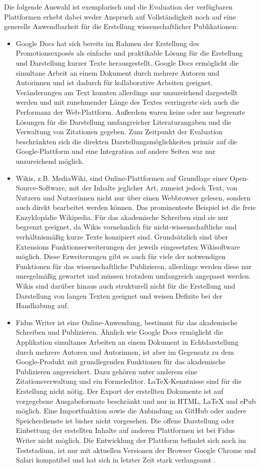 Die folgende Auswahl ist exemplarisch und die Evaluation der verfügbaren Plattformen erhebt dabei weder Anspruch auf Vollständigkeit noch auf eine generelle Anwendbarkeit für die Erstellung wissenschaftlicher Publikationen:
\begin{itemize}
\item Google Docs hat sich bereits im Rahmen der Erstellung des Promotionsexposés als einfache und praktikable Lösung für die Erstellung und Darstellung kurzer Texte herausgestellt. Google Docs ermöglicht die simultane Arbeit an einem Dokument durch mehrere Autoren und Autorinnen und ist dadurch für kollaborative Arbeiten geeignet. Veränderungen am Text konnten allerdings nur unzureichend dargestellt werden und mit zunehmender Länge des Textes verringerte sich auch die Performanz der Web-Plattform. Außerdem waren keine oder nur begrenzte Lösungen für die Darstellung umfangreicher Literaturangaben und die Verwaltung von Zitationen gegeben. Zum Zeitpunkt der Evaluation beschränkten sich die direkten Darstellungsmöglichkeiten primär auf die Google-Plattform und eine Integration auf andere Seiten war nur unzureichend möglich.
\item Wikis, z.B. MediaWiki, sind Online-Plattformen auf Grundlage einer Open-Source-Software, mit der Inhalte jeglicher Art, zumeist jedoch Text, von Nutzern und Nutzerinnen nicht nur über einen Webbrowser gelesen, sondern auch direkt bearbeitet werden können. Das prominenteste Beispiel ist die freie Enzyklopädie Wikipedia. Für das akademische Schreiben sind sie nur begrenzt geeignet, da Wikis vornehmlich für nicht-wissenschaftliche und verhältnismäßig kurze Texte konzipiert sind. Grundsätzlich sind über Extensions Funktionserweiterungen der jeweils eingesetzten Wikisoftware möglich. Diese Erweiterungen gibt es auch für viele der notwendigen Funktionen für das wissenschaftliche Publizieren, allerdings werden diese nur unregelmäßig gewartet und müssen trotzdem umfangreich angepasst werden. Wikis sind darüber hinaus auch strukturell nicht für die Erstellung und Darstellung von langen Texten geeignet und weisen Defizite bei der Handhabung auf.
\item Fidus Writer ist eine Online-Anwendung, bestimmt für das akademische Schreiben und Publizieren. Ähnlich wie Google Docs ermöglicht die Applikation simultanes Arbeiten an einem Dokument in Echtdarstellung durch mehrere Autoren und Autorinnen, ist aber im Gegensatz zu dem Google-Produkt mit grundlegenden Funktionen für das akademische Publizieren angereichert. Dazu gehören unter anderem eine Zitationsverwaltung und ein Formeleditor. LaTeX-Kenntnisse sind für die Erstellung nicht nötig. Der Export der erstellten Dokumente ist auf vorgegebene Ausgabeformate beschränkt und nur in HTML, LaTeX und ePub möglich. Eine Importfunktion sowie die Anbindung an GitHub oder andere Speicherdienste ist bisher nicht vorgesehen. Die offene Darstellung oder Einbettung der erstellten Inhalte auf anderen Plattformen ist bei Fidus Writer nicht möglich. Die Entwicklung der Plattform befindet sich noch im Teststadium, ist nur mit aktuellen Versionen der Browser Google Chrome und Safari kompatibel und hat sich in letzter Zeit stark verlangsamt \cite{Wilm_2015}.

\end{itemize}
